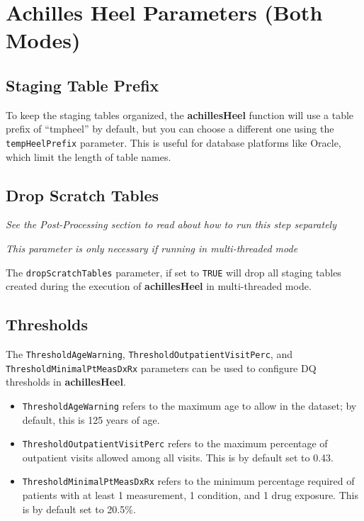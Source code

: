 \documentclass[]{article}
\providecommand{\tightlist}{%
  \setlength{\itemsep}{0pt}\setlength{\parskip}{0pt}}
\begin{document}
\section{Achilles Heel Parameters (Both
Modes)}\label{achilles-heel-parameters-both-modes}

\subsection{Staging Table Prefix}\label{staging-table-prefix-1}

To keep the staging tables organized, the \textbf{achillesHeel} function
will use a table prefix of ``tmpheel'' by default, but you can choose a
different one using the \texttt{tempHeelPrefix} parameter. This is
useful for database platforms like Oracle, which limit the length of
table names.

\subsection{Drop Scratch Tables}\label{drop-scratch-tables-1}

\emph{See the Post-Processing section to read about how to run this step
separately}

\emph{This parameter is only necessary if running in multi-threaded
mode}

The \texttt{dropScratchTables} parameter, if set to \texttt{TRUE} will
drop all staging tables created during the execution of
\textbf{achillesHeel} in multi-threaded mode.

\subsection{Thresholds}\label{thresholds}

The \texttt{ThresholdAgeWarning}, \texttt{ThresholdOutpatientVisitPerc},
and \texttt{ThresholdMinimalPtMeasDxRx} parameters can be used to
configure DQ thresholds in \textbf{achillesHeel}.

\begin{itemize}
\tightlist
\item
  \texttt{ThresholdAgeWarning} refers to the maximum age to allow in the
  dataset; by default, this is 125 years of age.
\item
  \texttt{ThresholdOutpatientVisitPerc} refers to the maximum percentage
  of outpatient visits allowed among all visits. This is by default set
  to 0.43.
\item
  \texttt{ThresholdMinimalPtMeasDxRx} refers to the minimum percentage
  required of patients with at least 1 measurement, 1 condition, and 1
  drug exposure. This is by default set to 20.5\%.
\end{itemize}
\end{document}
